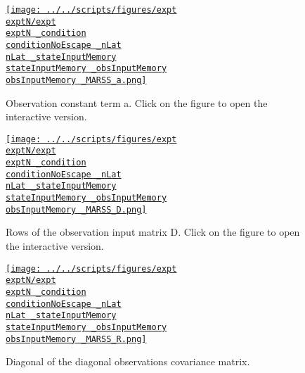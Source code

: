 \documentclass[12 pt]{article}  %
\begin{document}
\begin{figure}
    \begin{center}
            \href{http://www.gatsby.ucl.ac.uk/~rapela/sepi/reports/kfAnalysis/figures/expt\exptN/expt\exptN _condition\conditionNoEscape _nLat\nLat _stateInputMemory\stateInputMemory _obsInputMemory\obsInputMemory _MARSS_a.html}{\texttt{[image: ../../scripts/figures/expt\\exptN/expt\\exptN \_condition\\conditionNoEscape \_nLat\\nLat \_stateInputMemory\\stateInputMemory \_obsInputMemory\\obsInputMemory \_MARSS\_a.png]}}
            \caption{Observation constant term a. Click on the figure to open the interactive version.}
        \label{fig:a}
    \end{center}
\end{figure}

\begin{figure}
    \begin{center}
            \href{http://www.gatsby.ucl.ac.uk/~rapela/sepi/reports/kfAnalysis/figures/expt\exptN/expt\exptN _condition\conditionNoEscape _nLat\nLat _stateInputMemory\stateInputMemory _obsInputMemory\obsInputMemory _MARSS_D.html}{\texttt{[image: ../../scripts/figures/expt\\exptN/expt\\exptN \_condition\\conditionNoEscape \_nLat\\nLat \_stateInputMemory\\stateInputMemory \_obsInputMemory\\obsInputMemory \_MARSS\_D.png]}}
            \caption{Rows of the observation input matrix D. Click on the figure to open the interactive version.}
        \label{fig:D}
    \end{center}
\end{figure}

\begin{figure}
    \begin{center}
            \href{http://www.gatsby.ucl.ac.uk/~rapela/sepi/reports/kfAnalysis/figures/expt\exptN/expt\exptN _condition\conditionNoEscape _nLat\nLat _stateInputMemory\stateInputMemory _obsInputMemory\obsInputMemory _MARSS_R.html}{\texttt{[image: ../../scripts/figures/expt\\exptN/expt\\exptN \_condition\\conditionNoEscape \_nLat\\nLat \_stateInputMemory\\stateInputMemory \_obsInputMemory\\obsInputMemory \_MARSS\_R.png]}}
            \caption{Diagonal of the diagonal observations covariance matrix.}
        \label{fig:R}
    \end{center}
\end{figure}
\end{document}
